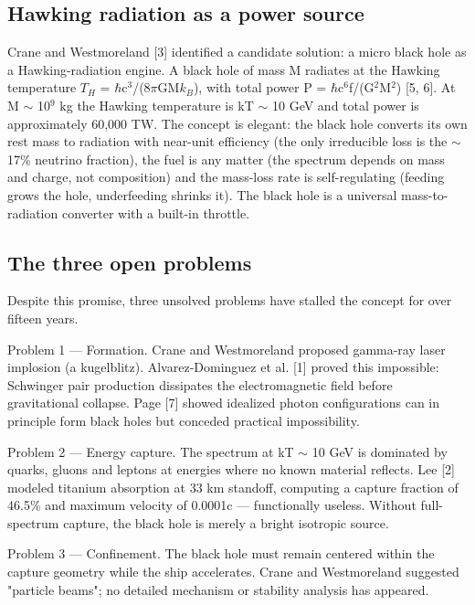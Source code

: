 \documentclass[12pt,a4paper]{article}
\begin{document}
\subsection{Hawking radiation as a power source}
Crane and Westmoreland [3] identified a candidate solution: a micro black hole as a Hawking-radiation engine. A black hole of mass M radiates at the Hawking temperature $T_H$ = $\hbar$c$^{3}$/(8$\pi$GM$k_B$), with total power P = $\hbar$c$^{6}$f/(G$^{2}$M$^{2}$) [5, 6]. At M $\sim$ 10$^{9}$ kg the Hawking temperature is kT $\sim$ 10 GeV and total power is approximately 60,000 TW. The concept is elegant: the black hole converts its own rest mass to radiation with near-unit efficiency (the only irreducible loss is the $\sim$17\% neutrino fraction), the fuel is any matter (the spectrum depends on mass and charge, not composition) and the mass-loss rate is self-regulating (feeding grows the hole, underfeeding shrinks it). The black hole is a universal mass-to-radiation converter with a built-in throttle.

\subsection{The three open problems}
Despite this promise, three unsolved problems have stalled the concept for over fifteen years.

Problem 1 --- Formation. Crane and Westmoreland proposed gamma-ray laser implosion (a kugelblitz). Alvarez-Dominguez et al. [1] proved this impossible: Schwinger pair production dissipates the electromagnetic field before gravitational collapse. Page [7] showed idealized photon configurations can in principle form black holes but conceded practical impossibility.

Problem 2 --- Energy capture. The spectrum at kT $\sim$ 10 GeV is dominated by quarks, gluons and leptons at energies where no known material reflects. Lee [2] modeled titanium absorption at 33 km standoff, computing a capture fraction of 46.5\% and maximum velocity of 0.0001c --- functionally useless. Without full-spectrum capture, the black hole is merely a bright isotropic source.

Problem 3 --- Confinement. The black hole must remain centered within the capture geometry while the ship accelerates. Crane and Westmoreland suggested "particle beams"; no detailed mechanism or stability analysis has appeared.
\end{document}
